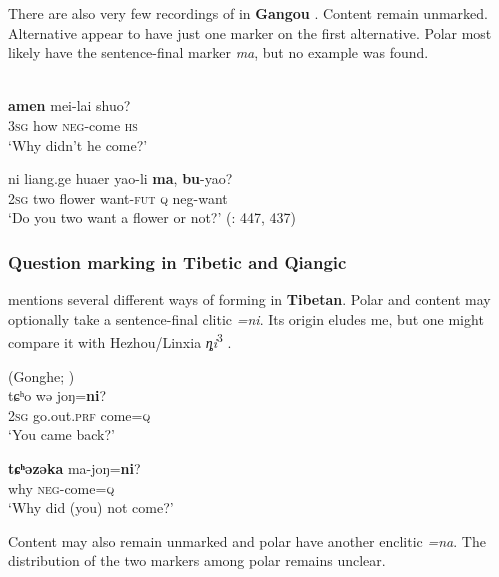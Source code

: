There are also very few recordings of  in \textbf{Gangou} . Content  remain unmarked. Alternative  appear to have just one marker on the first alternative. Polar  most likely have the sentence-final marker \textit{ma}, but no example was found.

\ea%
    \label{ex:trans:31}
    \\
    \ea{}
     \textbf{{amen}} mei-lai    shuo?\\
    3\textsc{sg}  how  \textsc{neg}-come  \textsc{hs}\\
    \glt ‘Why didn’t he come?’
    
    \ex{}
    \gll ni  liang.ge  huaer    yao-li \textbf{{ma}}, \textbf{{bu}}{-yao?}\\
    2\textsc{sg}  two    flower    want-\textsc{fut}  \textsc{q}  neg-want\\
    \glt ‘Do you two want a flower or not?’ (\citealt{ZhuYongzhong1997}: 447, 437)
    \z
    \z

\subsubsection{Question marking in Tibetic and Qiangic}\label{sec:5.9.2.2}

\cite[64f.]{Ebihara2011} mentions several different ways of forming  in \textbf{ Tibetan}. Polar and content  may optionally take a sentence-final clitic \textit{=ni}. Its origin eludes me, but one might compare it with Hezhou/Linxia \textit{ȵi}\textsuperscript{3} .

\ea%
    \label{ex:trans:32}
     (Gonghe; )\\
    \ea
    \gll tɕʰo  wə    joŋ=\textbf{{ni}}?\\
    2\textsc{sg}  go.out.\textsc{prf}  come=\textsc{q}\\
    \glt ‘You came back?’
    
    \ex
    \gll \textbf{{tɕ}}\textbf{{ʰ}}\textbf{{əzəka}} {ma-joŋ=}\textbf{{ni}}?\\
    why \textsc{neg}-come=\textsc{q}\\
    \glt ‘Why did (you) not come?’ \citep[65]{Ebihara2011}
    \z
    \z

Content  may also remain unmarked and polar  have another enclitic \textit{=na}. The distribution of the two markers among polar  remains unclear.


